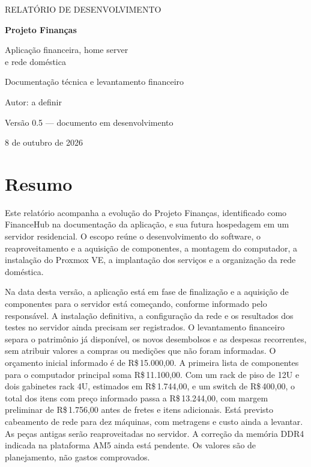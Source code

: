 \documentclass[11pt,a4paper,oneside]{report}
\newcommand{\dinheiro}[1]{R\$\,#1}
\newcommand{\versaorelatorio}{0.5}
\newcommand{\datarelatorio}{8 de outubro de 2026}
\newcommand{\autorrelatorio}{Autor: a definir}
\begin{document}
\begin{titlepage}
\centering
\vspace*{2cm}
{\Large RELATÓRIO DE DESENVOLVIMENTO\par}
\vspace{1.2cm}
{\Huge\bfseries\color{accent} Projeto Finanças\par}
\vspace{0.7cm}
{\Large Aplicação financeira, home server\\e rede doméstica\par}
\vspace{1.5cm}
{\large Documentação técnica e levantamento financeiro\par}
\vfill
{\large \autorrelatorio\par}
\vspace{0.5cm}
Versão \versaorelatorio{} --- documento em desenvolvimento\par
\datarelatorio\par
\end{titlepage}

\chapter*{Resumo}
Este relatório acompanha a evolução do Projeto Finanças, identificado como
FinanceHub na documentação da aplicação, e sua futura hospedagem em um servidor
residencial. O escopo reúne o desenvolvimento do software, o reaproveitamento e a
aquisição de componentes, a montagem do computador, a instalação do Proxmox VE,
a implantação dos serviços
e a organização da rede doméstica.

Na data desta versão, a aplicação está em fase de finalização e a aquisição de
componentes para o servidor está começando, conforme informado pelo responsável.
A instalação definitiva, a configuração da rede e os resultados dos testes no
servidor ainda precisam ser registrados. O levantamento financeiro separa o
patrimônio já disponível, os novos desembolsos e as despesas recorrentes, sem
atribuir valores a compras ou medições que não foram informadas.
O orçamento inicial informado é de \dinheiro{15.000,00}. A primeira lista de
componentes para o computador principal soma \dinheiro{11.100,00}.
Com um rack de piso de 12U e dois gabinetes rack 4U, estimados em
\dinheiro{1.744,00}, e um switch de \dinheiro{400,00}, o total dos itens com
preço informado passa a \dinheiro{13.244,00}, com margem preliminar de
\dinheiro{1.756,00} antes de fretes e itens adicionais. Está previsto cabeamento
de rede para dez máquinas, com metragens e custo ainda a levantar.
As peças antigas serão reaproveitadas no servidor. A correção da memória DDR4
indicada na plataforma AM5 ainda está pendente.
Os valores são de planejamento, não gastos comprovados.
\end{document}
